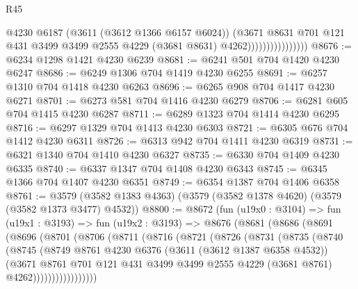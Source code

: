 \begin{lexlean}{R45}
\begin{coremodule}
                                  @4230
                                  @6187
                                  (@3611 (@3612 @1366 @6157 @6024))
                                  (@3671
                                    @8631
                                    @701
                                    @121
                                    @431
                                    @3499
                                    @3499
                                    @2555
                                    @4229
                                    (@3681 @8631)
                                    @4262))))))))))))))))
@8676 := @6234 @1298 @1421 @4230 @6239
@8681 := @6241 @501 @704 @1420 @4230 @6247
@8686 := @6249 @1306 @704 @1419 @4230 @6255
@8691 := @6257 @1310 @704 @1418 @4230 @6263
@8696 := @6265 @908 @704 @1417 @4230 @6271
@8701 := @6273 @581 @704 @1416 @4230 @6279
@8706 := @6281 @605 @704 @1415 @4230 @6287
@8711 := @6289 @1323 @704 @1414 @4230 @6295
@8716 := @6297 @1329 @704 @1413 @4230 @6303
@8721 := @6305 @676 @704 @1412 @4230 @6311
@8726 := @6313 @942 @704 @1411 @4230 @6319
@8731 := @6321 @1340 @704 @1410 @4230 @6327
@8735 := @6330 @704 @1409 @4230 @6335
@8740 := @6337 @1347 @704 @1408 @4230 @6343
@8745 := @6345 @1366 @704 @1407 @4230 @6351
@8749 := @6354 @1387 @704 @1406 @6358
@8761 := @3579 (@3582 @1383 @4363) (@3579 (@3582 @1378 @4620) (@3579 (@3582 @1373 @3477) @4532))
@8800 := @8672
    (fun (u19x0 : @3104) =>
    fun (u19x1 : @3193) =>
    fun (u19x2 : @3193) =>
    @8676
      (@8681
        (@8686
          (@8691
            (@8696
              (@8701
                (@8706
                  (@8711
                    (@8716
                      (@8721
                        (@8726
                          (@8731
                            (@8735
                              (@8740
                                (@8745
                                  (@8749
                                    @8761
                                    @4230
                                    @6376
                                    (@3611 (@3612 @1387 @6358 @4532))
                                    (@3671
                                      @8761
                                      @701
                                      @121
                                      @431
                                      @3499
                                      @3499
                                      @2555
                                      @4229
                                      (@3681 @8761)
                                      @4262)))))))))))))))))

\end{coremodule}
\end{lexlean}
